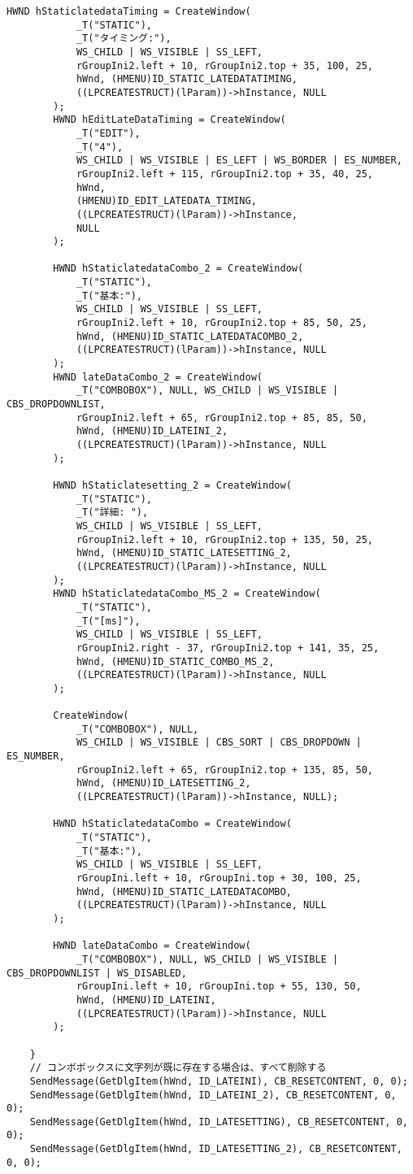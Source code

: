 \begin{lstlisting}[caption=window.cpp]
		HWND hStaticlatedataTiming = CreateWindow(
			_T("STATIC"),
			_T("タイミング:"),
			WS_CHILD | WS_VISIBLE | SS_LEFT,
			rGroupIni2.left + 10, rGroupIni2.top + 35, 100, 25,
			hWnd, (HMENU)ID_STATIC_LATEDATATIMING,
			((LPCREATESTRUCT)(lParam))->hInstance, NULL
		);
		HWND hEditLateDataTiming = CreateWindow(
			_T("EDIT"),
			_T("4"),
			WS_CHILD | WS_VISIBLE | ES_LEFT | WS_BORDER | ES_NUMBER,
			rGroupIni2.left + 115, rGroupIni2.top + 35, 40, 25,
			hWnd,
			(HMENU)ID_EDIT_LATEDATA_TIMING,
			((LPCREATESTRUCT)(lParam))->hInstance,
			NULL
		);

		HWND hStaticlatedataCombo_2 = CreateWindow(
			_T("STATIC"),
			_T("基本:"),
			WS_CHILD | WS_VISIBLE | SS_LEFT,
			rGroupIni2.left + 10, rGroupIni2.top + 85, 50, 25,
			hWnd, (HMENU)ID_STATIC_LATEDATACOMBO_2,
			((LPCREATESTRUCT)(lParam))->hInstance, NULL
		);
		HWND lateDataCombo_2 = CreateWindow(
			_T("COMBOBOX"), NULL, WS_CHILD | WS_VISIBLE | CBS_DROPDOWNLIST,
			rGroupIni2.left + 65, rGroupIni2.top + 85, 85, 50,
			hWnd, (HMENU)ID_LATEINI_2,
			((LPCREATESTRUCT)(lParam))->hInstance, NULL
		);

		HWND hStaticlatesetting_2 = CreateWindow(
			_T("STATIC"),
			_T("詳細: "),
			WS_CHILD | WS_VISIBLE | SS_LEFT,
			rGroupIni2.left + 10, rGroupIni2.top + 135, 50, 25,
			hWnd, (HMENU)ID_STATIC_LATESETTING_2,
			((LPCREATESTRUCT)(lParam))->hInstance, NULL
		);
		HWND hStaticlatedataCombo_MS_2 = CreateWindow(
			_T("STATIC"),
			_T("[ms]"),
			WS_CHILD | WS_VISIBLE | SS_LEFT,
			rGroupIni2.right - 37, rGroupIni2.top + 141, 35, 25,
			hWnd, (HMENU)ID_STATIC_COMBO_MS_2,
			((LPCREATESTRUCT)(lParam))->hInstance, NULL
		);

		CreateWindow(
			_T("COMBOBOX"), NULL,
			WS_CHILD | WS_VISIBLE | CBS_SORT | CBS_DROPDOWN | ES_NUMBER,
			rGroupIni2.left + 65, rGroupIni2.top + 135, 85, 50,
			hWnd, (HMENU)ID_LATESETTING_2,
			((LPCREATESTRUCT)(lParam))->hInstance, NULL);

		HWND hStaticlatedataCombo = CreateWindow(
			_T("STATIC"),
			_T("基本:"),
			WS_CHILD | WS_VISIBLE | SS_LEFT,
			rGroupIni.left + 10, rGroupIni.top + 30, 100, 25,
			hWnd, (HMENU)ID_STATIC_LATEDATACOMBO,
			((LPCREATESTRUCT)(lParam))->hInstance, NULL
		);

		HWND lateDataCombo = CreateWindow(
			_T("COMBOBOX"), NULL, WS_CHILD | WS_VISIBLE | CBS_DROPDOWNLIST | WS_DISABLED,
			rGroupIni.left + 10, rGroupIni.top + 55, 130, 50,
			hWnd, (HMENU)ID_LATEINI,
			((LPCREATESTRUCT)(lParam))->hInstance, NULL
		);

	}
	// コンボボックスに文字列が既に存在する場合は、すべて削除する
	SendMessage(GetDlgItem(hWnd, ID_LATEINI), CB_RESETCONTENT, 0, 0);
	SendMessage(GetDlgItem(hWnd, ID_LATEINI_2), CB_RESETCONTENT, 0, 0);
	SendMessage(GetDlgItem(hWnd, ID_LATESETTING), CB_RESETCONTENT, 0, 0);
	SendMessage(GetDlgItem(hWnd, ID_LATESETTING_2), CB_RESETCONTENT, 0, 0);


\end{lstlisting}
